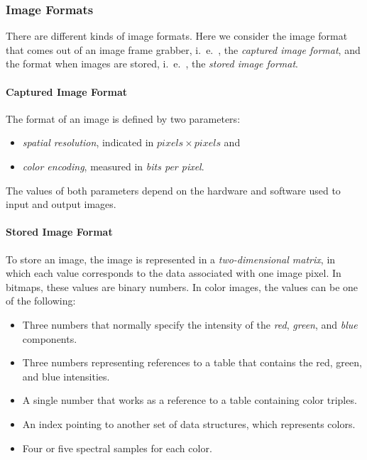   
 \subsubsection{Image Formats}
There are different kinds of image formats. Here we consider the image format that comes out of an image frame grabber, i.\ e.\ , the \textit{captured image format}, and the format when images are stored, i.\ e.\ , the \textit{stored image format}.

\paragraph*{Captured Image Format}
The format of an image is defined by two parameters:
\begin{itemize}
\item \textit{spatial resolution}, indicated in $ pixels \times  pixels $ and 
\item \textit{color encoding}, measured in \textit{bits per pixel}. 
\end{itemize}

The values of both parameters depend on the hardware and software used to input and output images.



\paragraph*{Stored Image Format}
To store an image, the image is represented in a \textit{two-dimensional matrix}, in which each value corresponds to the data associated with one image pixel. In bitmaps, these values are binary numbers. In color images, the values can be one of the following:

\begin{itemize}
	\item Three numbers that normally specify the intensity of the \textit{red}, \textit{green}, and \textit{blue}
	components.
	\item Three numbers representing references to a table that contains the red, green, and blue intensities.
	\item A single number that works as a reference to a table containing color triples.
	\item An index pointing to another set of data structures, which represents colors.
	\item Four or five spectral samples for each color.
\end{itemize}

